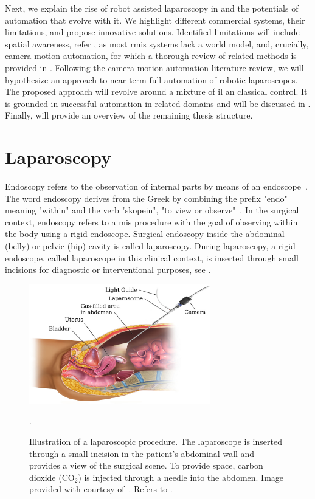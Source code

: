 Next, we explain the rise of robot assisted laparoscopy in  and the potentials of automation that evolve with it. We highlight different commercial systems, their limitations, and propose innovative solutions. Identified limitations will include spatial awareness, refer , as most \gls{rmis} systems lack a world model, and, crucially, camera motion automation, for which a thorough review of related methods is provided in . Following the camera motion automation literature review, we will hypothesize an approach to near-term full automation of robotic laparoscopes. The proposed approach will revolve around a mixture of \gls{il} an classical control. It is grounded in successful automation in related domains and will be discussed in . Finally,  will provide an overview of the remaining thesis structure.

\section{Laparoscopy}
\label{in:sec:laparoscopy}
Endoscopy refers to the observation of internal parts by means of an endoscope~\cite{oedendoscopy}. The word endoscopy derives from the Greek by combining the prefix "endo" meaning "within" and the verb "skopein", "to view or observe"~\cite{majumdar1993short}. In the surgical context, endoscopy refers to a \gls{mis} procedure with the goal of observing within the body using a rigid endoscope. Surgical endoscopy inside the abdominal (belly) or pelvic (hip) cavity is called laparoscopy. During laparoscopy, a rigid endoscope, called laparoscope in this clinical context, is inserted through small incisions for diagnostic or interventional purposes, see .
\begin{figure}[tb]
    \centering
    \includegraphics[width=0.7\textwidth]{introduction/img/laparoscopy.jpg}
    \caption{Illustration of a laparoscopic procedure. The laparoscope is inserted through a small incision in the patient's abdominal wall and provides a view of the surgical scene. To provide space, carbon dioxide ($\text{CO}_2$) is injected through a needle into the abdomen. Image provided with courtesy of~\cite{blausen2014laparoscopy}. Refers to .}
    \label{in:fig:laparoscopy}.
\end{figure}

